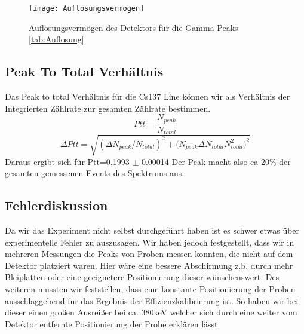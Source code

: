 \documentclass[]{article}
\begin{document}
	\begin{figure}
		\centering
		\texttt{[image: Auflosungsvermogen]}
		\caption{Auflösungsvermögen des Detektors für die Gamma-Peaks \ref{tab:Auflosung} \label{fig:auflosungsvermogen}}
	\end{figure}
	
	
	\subsection{Peak To Total Verhältnis}
	Das Peak to total Verhältnis für die Cs137 Line können wir als Verhältnis der Integrierten Zählrate zur gesamten Zählrate bestimmen.
	\begin{equation}
	Ptt=\frac{N_{peak}}{N_{total}}
	\end{equation}
	\begin{equation}
	\Delta Ptt=\sqrt{ (\Delta N_{peak}/N_{total})^2+(N_{peak} \Delta N_{total}{N_{total}^2)^2}}
	\end{equation}
	Daraus ergibt sich für Ptt=0.1993 $\pm$ 0.00014
	Der Peak macht also ca 20\% der gesamten gemessenen Events des Spektrums aus.
	\subsection{Fehlerdiskussion}
	Da wir das Experiment nicht selbst durchgeführt haben ist es schwer etwas über experimentelle Fehler zu auszusagen. Wir haben jedoch festgestellt, dass wir in mehreren Messungen die Peaks von Proben messen konnten, die nicht auf dem Detektor platziert waren. Hier wäre eine bessere Abschirmung z.b. durch mehr Bleiplatten oder eine geeignetere Positionierung dieser wünschenswert. Des weiteren mussten wir feststellen, dass eine konstante Positionierung der Proben ausschlaggebend für das Ergebnis der Effizienzkalibrierung ist. So haben wir bei dieser einen großen Ausreißer bei ca. 380keV welcher sich durch eine weiter vom Detektor entfernte Positionierung der Probe erklären lässt.
\end{document}
